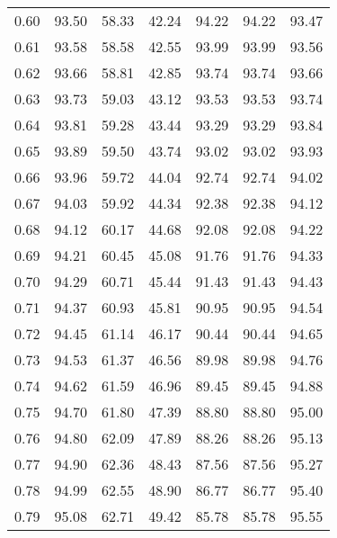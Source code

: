 \begin{tabular}{|c|c|c|c|c|c|c|}
      0.60 &     93.50 &     58.33 &      42.24 &   94.22 &      94.22 &         93.47 \\
      0.61 &     93.58 &     58.58 &      42.55 &   93.99 &      93.99 &         93.56 \\
      0.62 &     93.66 &     58.81 &      42.85 &   93.74 &      93.74 &         93.66 \\
      0.63 &     93.73 &     59.03 &      43.12 &   93.53 &      93.53 &         93.74 \\
      0.64 &     93.81 &     59.28 &      43.44 &   93.29 &      93.29 &         93.84 \\
      0.65 &     93.89 &     59.50 &      43.74 &   93.02 &      93.02 &         93.93 \\
      0.66 &     93.96 &     59.72 &      44.04 &   92.74 &      92.74 &         94.02 \\
      0.67 &     94.03 &     59.92 &      44.34 &   92.38 &      92.38 &         94.12 \\
      0.68 &     94.12 &     60.17 &      44.68 &   92.08 &      92.08 &         94.22 \\
      0.69 &     94.21 &     60.45 &      45.08 &   91.76 &      91.76 &         94.33 \\
      0.70 &     94.29 &     60.71 &      45.44 &   91.43 &      91.43 &         94.43 \\
      0.71 &     94.37 &     60.93 &      45.81 &   90.95 &      90.95 &         94.54 \\
      0.72 &     94.45 &     61.14 &      46.17 &   90.44 &      90.44 &         94.65 \\
      0.73 &     94.53 &     61.37 &      46.56 &   89.98 &      89.98 &         94.76 \\
      0.74 &     94.62 &     61.59 &      46.96 &   89.45 &      89.45 &         94.88 \\
      0.75 &     94.70 &     61.80 &      47.39 &   88.80 &      88.80 &         95.00 \\
      0.76 &     94.80 &     62.09 &      47.89 &   88.26 &      88.26 &         95.13 \\
      0.77 &     94.90 &     62.36 &      48.43 &   87.56 &      87.56 &         95.27 \\
      0.78 &     94.99 &     62.55 &      48.90 &   86.77 &      86.77 &         95.40 \\
      0.79 &     95.08 &     62.71 &      49.42 &   85.78 &      85.78 &         95.55 \\

\end{tabular}
